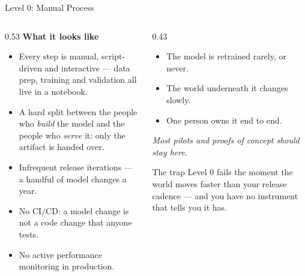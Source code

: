 \begin{frame}{Level 0: Manual Process}

    \begin{columns}[T]
        \begin{column}{0.53\textwidth}
            \textbf{What it looks like}
            \small
            \begin{itemize}
                \item Every step is manual, script-driven and interactive --- data prep, training and
                      validation all live in a notebook.
                \item A hard split between the people who \emph{build} the model and the people who
                      \emph{serve} it: only the artifact is handed over.
                \item Infrequent release iterations --- a handful of model changes a year.
                \item No CI/CD: a model change is not a code change that anyone tests.
                \item No active performance monitoring in production.
            \end{itemize}
        \end{column}
        \begin{column}{0.43\textwidth}
            \begin{tcolorbox}[colback=red!5, colframe=red!50, title=\small When level 0 is the right answer]
                \small
                \begin{itemize}
                    \item The model is retrained rarely, or never.
                    \item The world underneath it changes slowly.
                    \item One person owns it end to end.
                \end{itemize}
                \vspace{0.3em}
                \textit{Most pilots and proofs of concept should stay here.}
            \end{tcolorbox}
            \vspace{0.6em}
            \begin{alertblock}{The trap}
                \small Level 0 fails the moment the world moves faster than your release cadence --- and you
                have no instrument that tells you it has.
            \end{alertblock}
        \end{column}
    \end{columns}

\end{frame}

